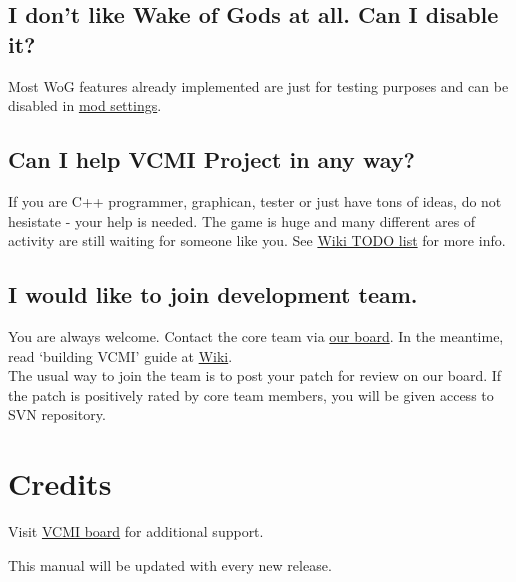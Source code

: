 \documentclass[a4size,final]{article}
\begin{document}
\subsection{I don't like Wake of Gods at all. Can I disable it?}
Most WoG features already implemented are just for testing purposes and can be disabled in \hyperref[Mods]{mod settings}.
\subsection{Can I help VCMI Project in any way?}
If you are C++ programmer, graphican, tester or just have tons of ideas, do not hesistate - your help is needed. The game is huge and many different ares of activity are still waiting for someone like you. See \href{http://wiki.vcmi.eu/index.php?title=TODO_list}{Wiki TODO list} for more info.
\subsection{I would like to join development team.}
You are always welcome. Contact the core team via \href{http://forum.vcmi.eu/index.php}{our board}. In the meantime, read `building VCMI' guide at \href{http://wiki.vcmi.eu/index.php?title=Main_Page}{Wiki}.\\
The usual way to join the team is to post your patch for review on our board. If the patch is positively rated by core team members, you will be given access to SVN repository.
\section{Credits}
Visit
\href{http://forum.vcmi.eu/index.php}{VCMI board}
for additional support.
\bigskip\\
\begin{center}
This manual will be updated with every new release.
\end{center}
\end{document}
